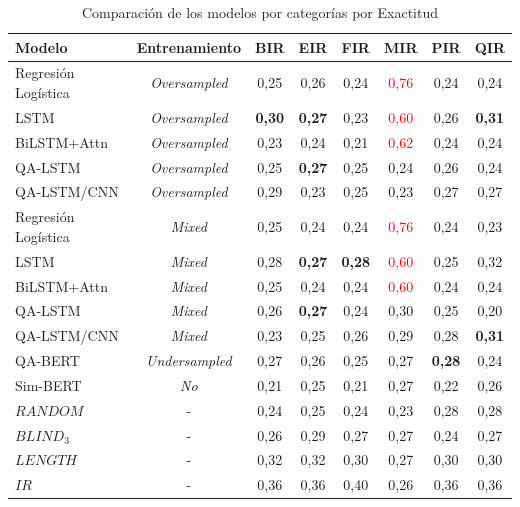 \begin{table}[!tb]
  \begin{center}
    \caption{Comparación de los modelos por categorías por Exactitud}
    \begin{tabular}{l|c|c|c|c|c|c|c}
      \textbf{Modelo} & \textbf{Entrenamiento} & \textbf{BIR} & \textbf{EIR} & \textbf{FIR} & \textbf{MIR} & \textbf{PIR} & \textbf{QIR}\\
      \hline

      Regresión Logística & \textit{Oversampled} & 0,25 & 0,26 & 0,24 & \textcolor{red}{0,76} & 0,24 & 0,24 \\
      LSTM & \textit{Oversampled} & \textbf{0,30} & \textbf{0,27} & 0,23 & \textcolor{red}{0,60} & 0,26 & \textbf{0,31}\\
      BiLSTM+Attn & \textit{Oversampled} & 0,23 & 0,24 & 0,21 & \textcolor{red}{0,62} & 0,24 & 0,24\\
      QA-LSTM & \textit{Oversampled} & 0,25 & \textbf{0,27} & 0,25 & 0,24 & 0,26 & 0,24\\
      QA-LSTM/CNN & \textit{Oversampled} & 0,29 & 0,23 & 0,25 & 0,23 & 0,27 & 0,27\\

      Regresión Logística & \textit{Mixed} & 0,25 & 0,24 & 0,24 & \textcolor{red}{0,76} & 0,24 & 0,23\\
      LSTM & \textit{Mixed} & 0,28 & \textbf{0,27} & \textbf{0,28} & \textcolor{red}{0,60} & 0,25 & 0,32\\
      BiLSTM+Attn & \textit{Mixed} & 0,25 & 0,24 & 0,24 & \textcolor{red}{0,60} & 0,24 & 0,24 \\
      QA-LSTM & \textit{Mixed} & 0,26 & \textbf{0,27} & 0,24 & 0,30 & 0,25 & 0,20 \\
      QA-LSTM/CNN & \textit{Mixed} & 0,23 & 0,25 & 0,26 & 0,29 & 0,28 & \textbf{0,31} \\

      QA-BERT & \textit{Undersampled} & 0,27 & 0,26 & 0,25 & 0,27 & \textbf{0,28} & 0,24\\
      Sim-BERT & \textit{No} & 0,21 & 0,25 & 0,21 & 0,27 & 0,22 & 0,26\\
      \hline
      $RANDOM$ & - & 0,24 & 0,25 & 0,24 & 0,23 & 0,28 & 0,28 \\
      $BLIND_3$ & - & 0,26 & 0,29 & 0,27 & 0,27 & 0,24 & 0,27 \\
      $LENGTH$ & - & 0,32 & 0,32 & 0,30 & 0,27 & 0,30 & 0,30 \\
      $IR$ & - & 0,36 & 0,36 & 0,40 & 0,26 & 0,36 & 0,36 \\

    \end{tabular}
  \end{center}
  \label{comparison_accuracy}
\end{table}

